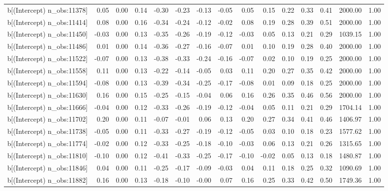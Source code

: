 \begin{table}[ht]
\begin{tabular}{rrrrrrrrrrrrrrr}
  b[(Intercept) n\_obs:11378] & 0.05 & 0.00 & 0.14 & -0.30 & -0.23 & -0.13 & -0.05 & 0.05 & 0.15 & 0.22 & 0.33 & 0.41 & 2000.00 & 1.00 \\ 
  b[(Intercept) n\_obs:11414] & 0.08 & 0.00 & 0.16 & -0.34 & -0.24 & -0.12 & -0.02 & 0.08 & 0.19 & 0.28 & 0.39 & 0.51 & 2000.00 & 1.00 \\ 
  b[(Intercept) n\_obs:11450] & -0.03 & 0.00 & 0.13 & -0.35 & -0.26 & -0.19 & -0.12 & -0.03 & 0.05 & 0.13 & 0.21 & 0.29 & 1039.15 & 1.00 \\ 
  b[(Intercept) n\_obs:11486] & 0.01 & 0.00 & 0.14 & -0.36 & -0.27 & -0.16 & -0.07 & 0.01 & 0.10 & 0.19 & 0.28 & 0.40 & 2000.00 & 1.00 \\ 
  b[(Intercept) n\_obs:11522] & -0.07 & 0.00 & 0.13 & -0.38 & -0.33 & -0.24 & -0.16 & -0.07 & 0.02 & 0.10 & 0.19 & 0.25 & 2000.00 & 1.00 \\ 
  b[(Intercept) n\_obs:11558] & 0.11 & 0.00 & 0.13 & -0.22 & -0.14 & -0.05 & 0.03 & 0.11 & 0.20 & 0.27 & 0.35 & 0.42 & 2000.00 & 1.00 \\ 
  b[(Intercept) n\_obs:11594] & -0.08 & 0.00 & 0.13 & -0.39 & -0.34 & -0.25 & -0.17 & -0.08 & 0.01 & 0.09 & 0.18 & 0.25 & 2000.00 & 1.00 \\ 
  b[(Intercept) n\_obs:11630] & 0.16 & 0.00 & 0.15 & -0.25 & -0.15 & -0.04 & 0.06 & 0.16 & 0.26 & 0.35 & 0.46 & 0.56 & 2000.00 & 1.00 \\ 
  b[(Intercept) n\_obs:11666] & -0.04 & 0.00 & 0.12 & -0.33 & -0.26 & -0.19 & -0.12 & -0.04 & 0.05 & 0.11 & 0.21 & 0.29 & 1704.14 & 1.00 \\ 
  b[(Intercept) n\_obs:11702] & 0.20 & 0.00 & 0.11 & -0.07 & -0.01 & 0.06 & 0.13 & 0.20 & 0.27 & 0.34 & 0.41 & 0.46 & 1406.97 & 1.00 \\ 
  b[(Intercept) n\_obs:11738] & -0.05 & 0.00 & 0.11 & -0.33 & -0.27 & -0.19 & -0.12 & -0.05 & 0.03 & 0.10 & 0.18 & 0.23 & 1577.62 & 1.00 \\ 
  b[(Intercept) n\_obs:11774] & -0.02 & 0.00 & 0.12 & -0.33 & -0.25 & -0.18 & -0.10 & -0.03 & 0.06 & 0.13 & 0.21 & 0.26 & 1315.65 & 1.00 \\ 
  b[(Intercept) n\_obs:11810] & -0.10 & 0.00 & 0.12 & -0.41 & -0.33 & -0.25 & -0.17 & -0.10 & -0.02 & 0.05 & 0.13 & 0.18 & 1480.87 & 1.00 \\ 
  b[(Intercept) n\_obs:11846] & 0.04 & 0.00 & 0.11 & -0.25 & -0.17 & -0.09 & -0.03 & 0.04 & 0.11 & 0.18 & 0.25 & 0.32 & 1090.69 & 1.00 \\ 
  b[(Intercept) n\_obs:11882] & 0.16 & 0.00 & 0.13 & -0.18 & -0.10 & -0.00 & 0.07 & 0.16 & 0.25 & 0.33 & 0.42 & 0.50 & 1749.36 & 1.00 \\ 

\end{tabular}
\end{table}

